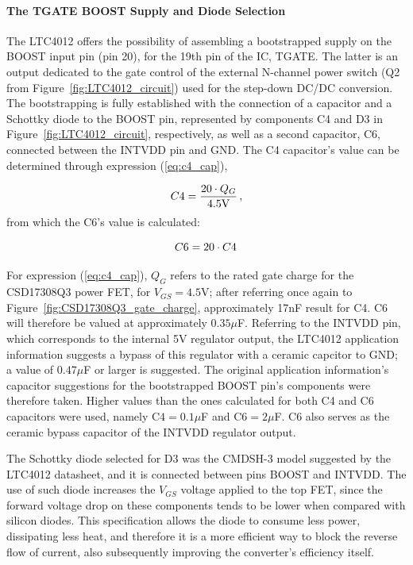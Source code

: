 \paragraph{The TGATE BOOST Supply and Diode Selection}	The LTC4012 offers the possibility of assembling a bootstrapped supply on the BOOST input pin (pin 20), for the 19th pin of the IC, TGATE. The latter is an output dedicated to the gate control of the external N-channel power switch (Q2 from Figure~\ref{fig:LTC4012_circuit}) used for the step-down DC/DC conversion. The bootstrapping is fully established with the connection of a capacitor and a Schottky diode to the BOOST pin, represented by components C4 and D3 in Figure~\ref{fig:LTC4012_circuit}, respectively, as well as a second capacitor, C6, connected between the INTVDD pin and GND. The C4 capacitor's value can be determined through expression (\ref{eq:c4_cap}),

\begin{equation}\label{eq:c4_cap}
	C4=\frac{20 \cdot Q_G}{4.5\textrm{V}}\,,\medskip
\end{equation}
from which the C6's value is calculated:

\begin{equation}\label{eq:c6_cap}
	C6=20 \cdot C4\,\medskip
\end{equation}

\noindent For expression (\ref{eq:c4_cap}), $Q_G$ refers to the rated gate charge for the CSD17308Q3 power FET, for $V_{GS}=4.5$V; after referring once again to Figure~\ref{fig:CSD17308Q3_gate_charge}, approximately 17nF result for C4. C6 will therefore be valued at approximately $0.35 \mu$F. Referring to the INTVDD pin, which corresponds to the internal 5V regulator output, the LTC4012 application information suggests a bypass of this regulator with a ceramic capcitor to GND; a value of $0.47 \mu$F or larger is suggested. The original application information's capacitor suggestions for the bootstrapped BOOST pin's components were therefore taken. Higher values than the ones calculated for both C4 and C6 capacitors were used, namely $\textrm{C4}=0.1 \mu$F and $\textrm{C6}=2 \mu$F. C6 also serves as the ceramic bypass capacitor of the INTVDD regulator output.

The Schottky diode selected for D3 was the CMDSH-3 model suggested by the LTC4012 datasheet, and it is connected between pins BOOST and INTVDD.
The use of such diode increases the $V_{GS}$ voltage applied to the top FET, since the forward voltage drop on these components tends to be lower when compared with silicon diodes.
This specification allows the diode to consume less power, dissipating less heat, and therefore it is a more efficient way to block the reverse flow of current, also subsequently improving the converter's efficiency itself.

